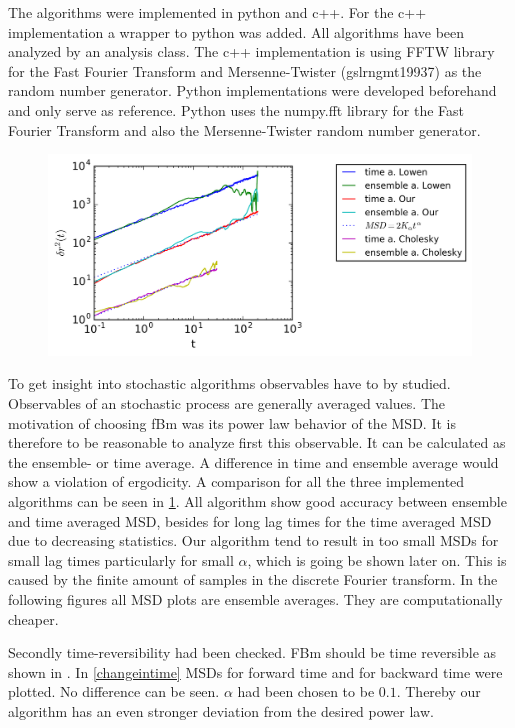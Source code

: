 \documentclass[
  a4paper,BCOR10mm,oneside,
  headsepline,footsepline,%
  fleqn,openbib
]{scrbook}
\begin{document}
The algorithms were implemented in python and c++. For the c++ implementation a wrapper to python was added. All algorithms have been analyzed by an analysis class. The c++ implementation is using FFTW library for the Fast Fourier Transform and Mersenne-Twister (gsl\texttt{\textunderscore}rng\texttt{\textunderscore}mt19937) as the random number generator. Python implementations were developed beforehand and only serve as reference. Python uses the numpy.fft library for the Fast Fourier Transform and also the Mersenne-Twister random number generator.\par
\begin{figure}[h!]
  \centering
  \includegraphics[width=\textwidth]{./data/timevsensambe.png}
  \captionsetup{width=\linewidth}
  \label{fig:4}
\end{figure}
To get insight into stochastic algorithms observables have to by studied. Observables of an stochastic process are generally averaged values. The motivation of choosing fBm was its power law behavior of the MSD. It is therefore to be reasonable to analyze first this observable. It can be calculated as the ensemble- or time average. A difference in time and ensemble average would show a violation of ergodicity. A comparison for all the three implemented algorithms can be seen in \cref{fig:4}. All algorithm show good accuracy between ensemble and time averaged MSD, besides for long lag times for the time averaged MSD due to decreasing statistics. Our algorithm tend to result in too  small MSDs for small lag times particularly for small $\alpha$, which is going be shown later on. This is caused by the finite amount of samples in the discrete Fourier transform. In the following figures all MSD plots are ensemble averages. They are computationally cheaper.\par Secondly time-reversibility had been checked. FBm should be time reversible as shown in \cite{Horvai2007}. In \cref{changeintime} MSDs for forward time and for backward time were plotted. No difference can be seen. $\alpha$ had been chosen to be $0.1$. Thereby our algorithm has an even stronger deviation from the desired power law.
\end{document}
